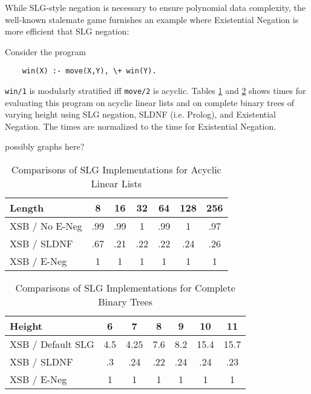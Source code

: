 
While SLG-style negation is necessary to ensure polynomial data complexity,
the well-known stalemate game furnishes an example where Existential
Negation is more efficient that SLG negation:
\begin{example} \label{strat-exp} \rm 
Consider the program
\begin{verbatim}
    win(X) :- move(X,Y), \+ win(Y).
\end{verbatim}
{\tt win/1} is modularly stratified iff {\tt move/2} is acyclic.
Tables \ref{slg-xsb1} and \ref{slg-xsb2} shows times for evaluating 
this program on acyclic linear lists and on
complete binary trees of varying height using SLG negation, SLDNF
(i.e.  Prolog), and Existential Negation. The times are normalized to
the time for Existential Negation.
\end{example}


possibly graphs here?

\begin{table}[htbp]
\begin{center}
\begin{tabular}{|l|c|c|c|c|c|c|} \hline
Length         & 8      & 16    & 32    & 64    & 128   & 256   \\ \hline
XSB / No E-Neg & .99    & .99   & 1     & .99   & 1     & .97\\ \hline
XSB / SLDNF    & .67    & .21   & .22   & .22   & .24   & .26   \\ \hline
XSB / E-Neg   & 1       & 1     & 1     & 1     & 1     & 1     \\ \hline
\end{tabular}
\end{center}
\caption{Comparisons of SLG Implementations for Acyclic Linear Lists}\label{slg-xsb1}
\end{table}

\begin{table}[htbp]
\begin{center}
\begin{tabular}{|l|c|c|c|c|c|c|} \hline
Height          & 6       & 7   & 8     & 9     & 10    & 11 \\ \hline
XSB / Default SLG & 4.5 & 4.25  & 7.6   & 8.2   & 15.4  & 15.7 \\ \hline
XSB / SLDNF     & .3    & .24   & .22   & .24   & .24   & .23 \\ \hline
XSB / E-Neg     & 1     & 1     & 1     & 1     & 1     & 1     \\ \hline
\end{tabular}
\end{center}
\caption{Comparisons of SLG Implementations for Complete Binary Trees}\label{slg-xsb2}
\end{table}

